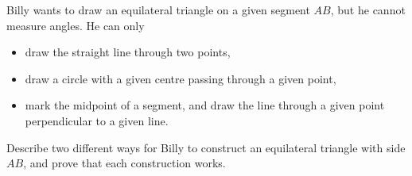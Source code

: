 Billy wants to draw an equilateral triangle on a given segment $AB$, but he cannot measure angles. He can only
\begin{itemize}
\item draw the straight line through two points,
\item draw a circle with a given centre passing through a given point,
\item mark the midpoint of a segment, and draw the line through a given point perpendicular to a given line.
\end{itemize}
Describe two different ways for Billy to construct an equilateral triangle with side $AB$, and prove that each construction works.
